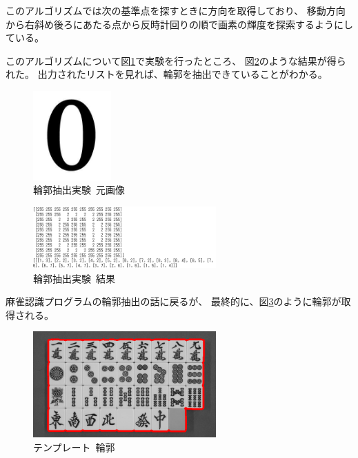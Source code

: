 \documentclass{jsarticle}
\begin{document}
\begin{multicols}{2}

このアルゴリズムでは次の基準点を探すときに方向を取得しており、
移動方向から右斜め後ろにあたる点から反時計回りの順で画素の輝度を探索するようにしている。

このアルゴリズムについて図\ref{fig:zero}で実験を行ったところ、
図\ref{fig:zeroRes}のような結果が得られた。
出力されたリストを見れば、輪郭を抽出できていることがわかる。

\begin{figure}[H]
  \begin{center}
    \includegraphics[clip,width=3.0cm]{./img/zero.png}
    \caption{輪郭抽出実験\ 元画像}
    \label{fig:zero}
  \end{center}
\end{figure}

\begin{figure}[H]
  \begin{center}
    \includegraphics[clip,width=7.0cm]{./img/zeroRes.png}
    \caption{輪郭抽出実験\ 結果}
    \label{fig:zeroRes}
  \end{center}
\end{figure}

麻雀認識プログラムの輪郭抽出の話に戻るが、
最終的に、図\ref{fig:templateContour}のように輪郭が取得される。

\begin{figure}[H]
  \begin{center}
    \includegraphics[clip,width=7.0cm]{./img/template_contour.png}
    \caption{テンプレート\ 輪郭}
    \label{fig:templateContour}
  \end{center}
\end{figure}


\end{multicols}
\end{document}

